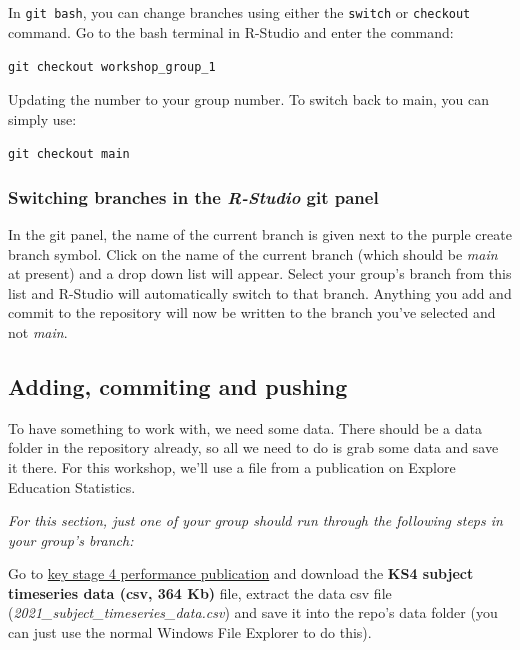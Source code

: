 \documentclass[
  12pt,
]{article}
\begin{document}
In \texttt{git\ bash}, you can change branches using either the
\texttt{switch} or \texttt{checkout} command. Go to the bash terminal in
R-Studio and enter the command:

\texttt{git\ checkout\ workshop\_group\_1}

Updating the number to your group number. To switch back to main, you
can simply use:

\texttt{git\ checkout\ main}

\hypertarget{switching-branches-in-the-r-studio-git-panel}{%
\subsubsection{\texorpdfstring{Switching branches in the \emph{R-Studio}
git
panel}{Switching branches in the R-Studio git panel}}\label{switching-branches-in-the-r-studio-git-panel}}

In the git panel, the name of the current branch is given next to the
purple create branch symbol. Click on the name of the current branch
(which should be \emph{main} at present) and a drop down list will
appear. Select your group's branch from this list and R-Studio will
automatically switch to that branch. Anything you add and commit to the
repository will now be written to the branch you've selected and not
\emph{main}.

\hypertarget{adding-commiting-and-pushing}{%
\subsection{Adding, commiting and
pushing}\label{adding-commiting-and-pushing}}

To have something to work with, we need some data. There should be a
data folder in the repository already, so all we need to do is grab some
data and save it there. For this workshop, we'll use a file from a
publication on Explore Education Statistics.

\emph{For this section, just one of your group should run through the
following steps in your group's branch:}

Go to
\href{https://explore-education-statistics.service.gov.uk/data-catalogue/key-stage-4-performance-revised/2020-21}{key
stage 4 performance publication} and download the \textbf{KS4 subject
timeseries data (csv, 364 Kb)} file, extract the data csv file
(\emph{2021\_subject\_timeseries\_data.csv}) and save it into the repo's
data folder (you can just use the normal Windows File Explorer to do
this).
\end{document}
